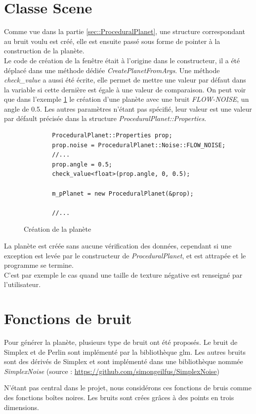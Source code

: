   \section{Classe Scene}
  Comme vue dans la partie \ref{sec::ProceduralPlanet}, une structure correspondant au bruit voulu est créé,
  elle est ensuite passé sous forme de pointer à la construction de la planète.\\
  
  Le code de création de la fenêtre était à l'origine dans le constructeur, il a été déplacé dans une méthode dédiée \textit{CreatePlanetFromArgs}. Une méthode \textit{check_value} a aussi été écrite, elle permet de mettre une valeur par défaut dans la variable si cette dernière est égale à une valeur de comparaison. On peut voir que dans l'exemple \ref{fig:code_scene} le création d'une planète avec une bruit \textit{FLOW-NOISE}, un angle de 0.5. Les autres paramètres n'étant pas spécifié, leur valeur est une valeur par défault précisée dans la structure \textit{ProceduralPlanet::Properties}.
  
  \begin{figure}
    \centering
      \lstset{language=C++}
      \begin{lstlisting}
        ProceduralPlanet::Properties prop;
        prop.noise = ProceduralPlanet::Noise::FLOW_NOISE;
        //...
        prop.angle = 0.5;
        check_value<float>(prop.angle, 0, 0.5);
        
        m_pPlanet = new ProceduralPlanet(&prop);
            
        //...
      \end{lstlisting}    
      \caption{Création de la planète}
      \label{fig:code_scene}
  \end{figure}
  
  
  La planète est créée sans aucune vérification des données, cependant si une exception est levée par le constructeur de \textit{ProceduralPlanet}, et est attrapée et le programme se termine.\\
  C'est par exemple le cas quand une taille de texture négative est renseigné par l'utilisateur.
  
  \section{Fonctions de bruit}
  
  Pour générer la planète, plusieurs type de bruit ont été proposés. Le bruit de Simplex et de Perlin sont implémenté par la bibliothèque glm. Les autres bruits sont des dérivés de Simplex et sont implémenté dans une bibliothèque nommée \textit{SimplexNoise} (source : \url{https://github.com/simongeilfus/SimplexNoise})
  
  N'étant pas central dans le projet, nous considérons ces fonctions de bruis comme des fonctions boîtes noires.
  Les bruits sont crées grâces à des points en trois dimensions. 
  
